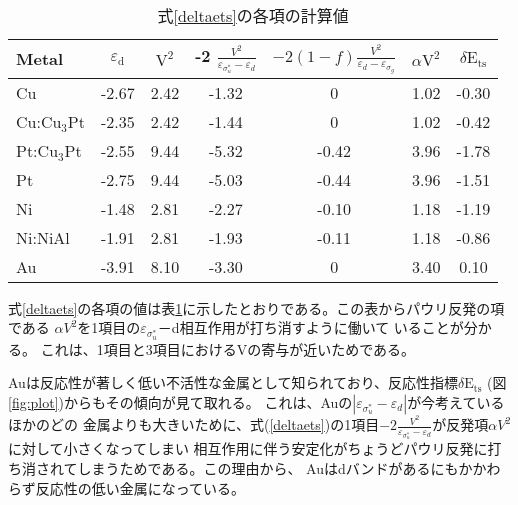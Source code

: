 \documentclass[12pt]{ltjsarticle}
\begin{document}
\begin{table}[htb]
  \begin{center}
    \caption{式\ref{deltaets}の各項の計算値}
    \begin{tabular}{l|cccccc} \hline
    \label{table}
      Metal & $\varepsilon_\text{d}$ & $\text{V}^\text{2}$ & -2 $\frac{ V^2 }{\varepsilon _{\sigma_u^*}- \varepsilon _d}$ & $-2(1-f)\frac{V^2}{\varepsilon _d - \varepsilon _{\sigma_g}} $ & $\alpha \text{V}^\text{2}$ & $\delta \text{E}_\text{ts}$ \\ \hline
      Cu                        & -2.67 & 2.42 & -1.32 & 0     & 1.02 & -0.30 \\
      Cu:$\text{Cu}_\text{3}$Pt & -2.35 & 2.42 & -1.44 & 0     & 1.02 & -0.42 \\
      Pt:$\text{Cu}_\text{3}$Pt & -2.55 & 9.44 & -5.32 & -0.42 & 3.96 & -1.78 \\
      Pt                        & -2.75 & 9.44 & -5.03 & -0.44 & 3.96 & -1.51 \\
      Ni                        & -1.48 & 2.81 & -2.27 & -0.10 & 1.18 & -1.19 \\ 
      Ni:NiAl                   & -1.91 & 2.81 & -1.93 & -0.11 & 1.18 & -0.86 \\
      Au                        & -3.91 & 8.10 & -3.30 & 0     & 3.40 & 0.10  \\ \hline
    \end{tabular}
  \end{center}
\end{table}

式\ref{deltaets}の各項の値は表\ref{table}に示したとおりである。この表からパウリ反発の項である
$\alpha V^2$を1項目の$\varepsilon _{\sigma_u^*}$－d相互作用が打ち消すように働いて
いることが分かる。
これは、1項目と3項目におけるVの寄与が近いためである。

Auは反応性が著しく低い不活性な金属として知られており、反応性指標$\delta \text{E}_\text{ts}$
(図\ref{fig:plot})からもその傾向が見て取れる。
これは、Auの$| \varepsilon _{\sigma_u^*} - \varepsilon _d|$が今考えているほかのどの
金属よりも大きいために、式(\ref{deltaets})の1項目$-2 \frac{ V^2 }{\varepsilon _
{\sigma_u^*} - \varepsilon _d}$が反発項$\alpha V^2$に対して小さくなってしまい
相互作用に伴う安定化がちょうどパウリ反発に打ち消されてしまうためである。この理由から、
Auはdバンドがあるにもかかわらず反応性の低い金属になっている。
\end{document}
